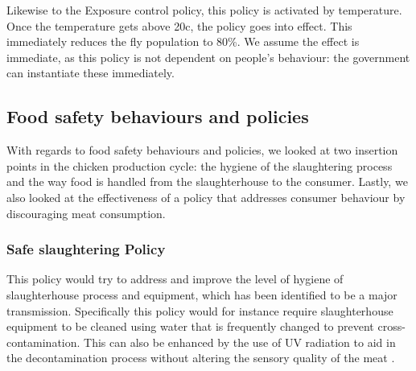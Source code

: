 Likewise to the Exposure control policy, this policy is activated by temperature. Once the temperature gets above 20\degree c, the policy goes into effect. This immediately reduces the fly population to 80\%. We assume the effect is immediate, as this policy is not dependent on people's behaviour: the government can instantiate these immediately.

\subsection{Food safety behaviours and policies}
\label{s:foodbehaviour}
With regards to food safety behaviours and policies, we looked at two insertion points in the chicken production cycle: the hygiene of the slaughtering process and the way food is handled from the slaughterhouse to the consumer. Lastly, we also looked at the effectiveness of a policy that addresses consumer behaviour by discouraging meat consumption.

\subsubsection{Safe slaughtering Policy}
This policy would try to address and improve the level of hygiene of slaughterhouse process and equipment, which has been identified to be a major transmission. Specifically this policy would for instance require slaughterhouse equipment to be cleaned using water that is frequently changed to prevent cross-contamination. This can also be enhanced by the use of UV radiation to aid in the decontamination process without altering the sensory quality of the meat \parencite{isohanni_use_2009}.

